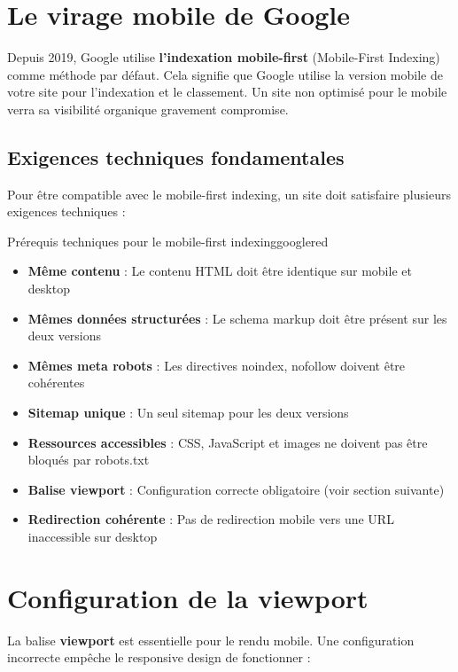 \documentclass[12pt,a4paper,twoside]{report}
\newcommand{\keyword}[1]{\textbf{\textcolor{googleblue}{#1}}}
\begin{document}
\section{Le virage mobile de Google}

Depuis 2019, Google utilise \keyword{l'indexation mobile-first} (Mobile-First Indexing) comme méthode par défaut. Cela signifie que Google utilise la version mobile de votre site pour l'indexation et le classement. Un site non optimisé pour le mobile verra sa visibilité organique gravement compromise.

\subsection{Exigences techniques fondamentales}

Pour être compatible avec le mobile-first indexing, un site doit satisfaire plusieurs exigences techniques :

\begin{mybox}{Prérequis techniques pour le mobile-first indexing}{googlered}
\begin{itemize}
    \item \textbf{Même contenu} : Le contenu HTML doit être identique sur mobile et desktop
    \item \textbf{Mêmes données structurées} : Le schema markup doit être présent sur les deux versions
    \item \textbf{Mêmes meta robots} : Les directives noindex, nofollow doivent être cohérentes
    \item \textbf{Sitemap unique} : Un seul sitemap pour les deux versions
    \item \textbf{Ressources accessibles} : CSS, JavaScript et images ne doivent pas être bloqués par robots.txt
    \item \textbf{Balise viewport} : Configuration correcte obligatoire (voir section suivante)
    \item \textbf{Redirection cohérente} : Pas de redirection mobile vers une URL inaccessible sur desktop
\end{itemize}
\end{mybox}

\section{Configuration de la viewport}

La balise \keyword{viewport} est essentielle pour le rendu mobile. Une configuration incorrecte empêche le responsive design de fonctionner :
\end{document}
